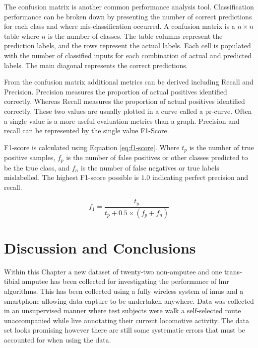 The confusion matrix is another common performance analysis tool. Classification performance can be broken down by presenting the number of correct predictions for each class and where mis-classification occurred. A confusion matrix is a $n\times n$ table where $n$ is the number of classes. The table columns represent the prediction labels, and the rows represent the actual labels. Each cell is populated with the number of classified inputs for each combination of actual and predicted labels. The main diagonal represents the correct predictions.

From the confusion matrix additional metrics can be derived including Recall and Precision. Precision measures the proportion of actual positives identified correctly. Whereas Recall measures the proportion of actual positives identified correctly. These two values are usually plotted in a curve called a pr-curve. Often a single value is a more useful evaluation metrics than a graph. Precision and recall can be represented by the single value F1-Score.\cite{Goodfellow2015}

F1-score is calculated using Equation \ref{eq:f1-score}. Where $t_p$ is the number of true positive samples, $f_p$ is the number of false positives or other classes predicted to be the true class, and $f_n$ is the number of false negatives or true labels mislabelled. The highest F1-score possible is $1.0$ indicating perfect precision and recall.\cite{Goodfellow2015}

\begin{equation}
    \label{eq:f1-score}
    f_1 = \frac{t_p}{t_p + 0.5\times(f_p + f_n)}
\end{equation}


\section{Discussion and Conclusions}
Within this Chapter a new dataset of twenty-two non-amputee and one trans-tibial amputee has been collected for investigating the performance of \acrshort{lmr} algorithms. This has been collected using a fully wireless system of \acrshort{imu}s and a smartphone allowing data capture to be undertaken anywhere. Data was collected in an unsupervised manner where test subjects were walk a self-selected route unaccompanied while live annotating their current locomotive activity. The data set looks promising however there are still some systematic errors that must be accounted for when using the data.

